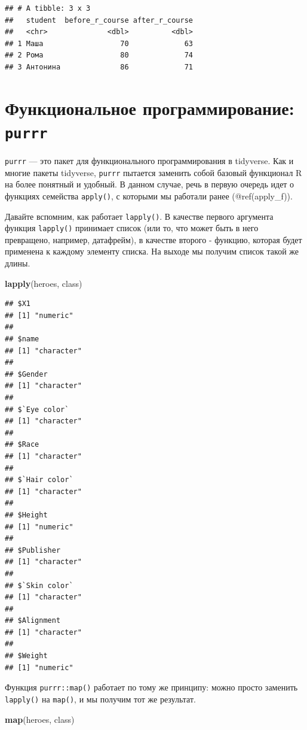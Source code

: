 \documentclass[]{book}
\newenvironment{Shaded}{\begin{snugshade}}{\end{snugshade}}
\newcommand{\KeywordTok}[1]{\textcolor[rgb]{0.13,0.29,0.53}{\textbf{#1}}}
\newcommand{\NormalTok}[1]{#1}
\begin{document}
\begin{verbatim}
## # A tibble: 3 x 3
##   student  before_r_course after_r_course
##   <chr>              <dbl>          <dbl>
## 1 Маша                  70             63
## 2 Рома                  80             74
## 3 Антонина              86             71
\end{verbatim}

\section{\texorpdfstring{Функциональное программирование:
\texttt{purrr}}{Функциональное программирование: purrr}}\label{purrr}

\texttt{purrr} --- это пакет для функционального программирования в
tidyverse. Как и многие пакеты tidyverse, \texttt{purrr} пытается
заменить собой базовый функционал R на более понятный и удобный. В
данном случае, речь в первую очередь идет о функциях семейства
\texttt{apply()}, с которыми мы работали ранее (@ref(apply\_f)).

Давайте вспомним, как работает \texttt{lapply()}. В качестве первого
аргумента функция \texttt{lapply()} принимает список (или то, что может
быть в него превращено, например, датафрейм), в качестве второго -
функцию, которая будет применена к каждому элементу списка. На выходе мы
получим список такой же длины.

\begin{Shaded}
\begin{Highlighting}[]
\KeywordTok{lapply}\NormalTok{(heroes, class)}
\end{Highlighting}
\end{Shaded}

\begin{verbatim}
## $X1
## [1] "numeric"
## 
## $name
## [1] "character"
## 
## $Gender
## [1] "character"
## 
## $`Eye color`
## [1] "character"
## 
## $Race
## [1] "character"
## 
## $`Hair color`
## [1] "character"
## 
## $Height
## [1] "numeric"
## 
## $Publisher
## [1] "character"
## 
## $`Skin color`
## [1] "character"
## 
## $Alignment
## [1] "character"
## 
## $Weight
## [1] "numeric"
\end{verbatim}

Функция \texttt{purrr::map()} работает по тому же принципу: можно просто
заменить \texttt{lapply()} на \texttt{map()}, и мы получим тот же
результат.

\begin{Shaded}
\begin{Highlighting}[]
\KeywordTok{map}\NormalTok{(heroes, class)}
\end{Highlighting}
\end{Shaded}
\end{document}
